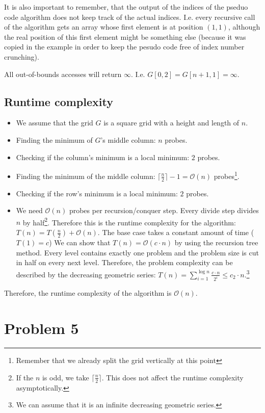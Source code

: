 \documentclass[12pt]{article}
\begin{document}
It is also important to remember, that the output of the indices of the pseduo code algorithm does not keep track of the actual indices. I.e. every recursive call of the algorithm gets an array whose first element is at position $(1,1)$, although the real position of this first element might be something else (because it was copied in the example in order to keep the pesudo code free of index number crunching).

All out-of-bounds accesses will return $\infty$. I.e. $G[0,2] = G[n+1, 1] = \infty$.

\subsection*{Runtime complexity}
\begin{itemize}
	\item We assume that the grid $G$ is a square grid with a height and length of $n$.
	\item Finding the minimum of $G$'s middle column: $n$ probes.
	\item Checking if the column's minimum is a local minimum: $2$ probes.
	\item Finding the minimum of the middle column: $\lceil \frac{n}{2} \rceil - 1 = \mathcal{O}(n)$ probes\footnote{Remember that we already split the grid vertically at this point}.
	\item Checking if the row's minimum is a local minimum: $2$ probes.
	\item We need $\mathcal{O}(n)$ probes per recursion/conquer step. Every divide step divides $n$ by half\footnote{If the $n$ is odd, we take $\lceil \frac{n}{2} \rceil$. This does not affect the runtime complexity asymptotically.}. Therefore this is the runtime complexity for the algorithm: $T(n) = T(\frac{n}{2}) + \mathcal{O}(n)$. The base case takes a constant amount of time ($T(1) = c$) We can show that $T(n) = \mathcal{O}(c \cdot n)$ by using the recursion tree method. Every level contains exactly one problem and the problem size is cut in half on every next level. Therefore, the problem complexity can be described by the decreasing geometric series: $T(n) = \sum_{i=1}^{\log n} \frac{c \cdot n}{2^i} \leq c_2 \cdot n$.\footnote{We can assume that it is an infinite decreasing geometric series.}
\end{itemize}
Therefore, the runtime complexity of the algorithm is $\mathcal{O}(n)$.

\section*{Problem 5}
\end{document}
